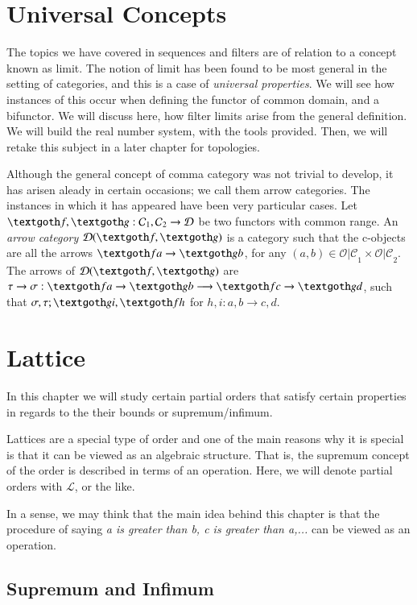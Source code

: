\documentclass [12pt]{book}
\begin{document}
	\chapter{Universal Concepts}

The topics we have covered in sequences and filters are of relation to a concept known as limit. The notion of limit has been found to be most general in the setting of categories, and this is a case of \textit{universal properties}. We will see how instances of this occur when defining the functor of common domain, and a bifunctor. We will discuss here, how filter limits arise from the general definition. We will build the real number system, with the tools provided. Then, we will retake this subject in a later chapter for topologies.

Although the general concept of comma category was not trivial to develop, it has arisen aleady in certain occasions; we call them arrow categories. The instances in which it has appeared have been very particular cases. Let $\textgoth f,\textgoth g:\mathcal C_1,\mathcal C_2\rightarrow\mathcal D$ be two functors with common range. An \textit{arrow category} $\mathcal D(\textgoth f,\textgoth g)$ is a category such that the c-objects are all the arrows $\textgoth fa\rightarrow\textgoth gb$, for any $(a,b)\in\mathcal{O|C}_1\times\mathcal{O|C}_2$. The arrows of $\mathcal D(\textgoth f,\textgoth g)$ are $\tau\rightarrow\sigma:\textgoth fa\rightarrow\textgoth gb\longrightarrow\textgoth fc\rightarrow\textgoth gd$, such that $\sigma,\tau;\textgoth gi,\textgoth fh$ for $h,i:a,b\rightarrow c,d$.

	\chapter{Lattice}

In this chapter we will study certain partial orders that satisfy certain properties in regards to the their bounds or supremum/infimum.

Lattices are a special type of order and one of the main reasons why it is special is that it can be viewed as an algebraic structure. That is, the supremum concept of the order is described in terms of an operation. Here, we will denote partial orders with $\mathcal L$, or the like.

In a sense, we may think that the main idea behind this chapter is that the procedure of saying \textit{a is greater than b, c is greater than a,...} can be viewed as an operation.

	\section{Supremum and Infimum}
\end{document}
